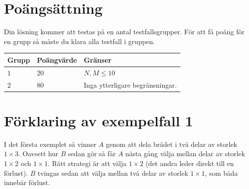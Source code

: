 \section*{Poängsättning}
Din lösning kommer att testas på en antal testfallsgrupper. För att få poäng för en grupp så måste du klara alla testfall i gruppen.

\noindent
\begin{tabular}{| l | l | l |}
	\hline
	Grupp & Poängvärde & Gränser\\ \hline
 $1$    & $20$        & $N, M \le 10$ \\ \hline
 $2$    & $80$        & Inga ytterligare begränsningar. \\ \hline
\end{tabular}


\section*{Förklaring av exempelfall 1}
I det första exemplet så vinner $A$ genom att dela brädet i två delar av storlek
$1 \times 3$. Oavsett hur $B$ sedan gör så får $A$ nästa gång välja mellan
delar av storlek $1 \times 2$ och $1 \times 1$. Rätt strategi är att välja $1
\times 2$ (det andra leder direkt till en förlust). $B$ tvingas sedan att välja
mellan två delar av storlek $1 \times 1$, som båda innebär förlust.
